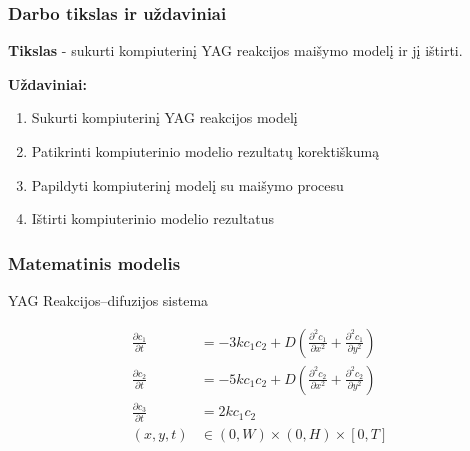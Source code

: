\documentclass{beamer}
\begin{document}
\begin{frame}
\frametitle{Darbo tikslas ir uždaviniai}
\textbf{Tikslas} - sukurti kompiuterinį YAG reakcijos maišymo modelį ir jį ištirti.

\textbf{Uždaviniai:}
\begin{enumerate}
\item Sukurti kompiuterinį YAG reakcijos modelį
\item Patikrinti kompiuterinio modelio rezultatų korektiškumą
\item Papildyti kompiuterinį modelį su maišymo procesu
\item Ištirti kompiuterinio modelio rezultatus
\end{enumerate}

\end{frame}

\begin{frame}
\frametitle{Matematinis modelis}

YAG Reakcijos--difuzijos sistema

\begin{align*}
    \frac{\partial c_1}{\partial t} & =-3kc_1c_2+D\left(\frac{\partial^2c_1}{\partial x^2}+\frac{\partial^2c_1}{\partial y^2}\right) \\
    \frac{\partial c_2}{\partial t} & =-5kc_1c_2+D\left(\frac{\partial^2c_2}{\partial x^2}+\frac{\partial^2c_2}{\partial y^2}\right)\\
    \frac{\partial c_3}{\partial t} & =2kc_1c_2\\
    (x, y, t)&\in(0, W)\times(0, H)\times[0, T]
\end{align*}

\end{frame}
\end{document}
